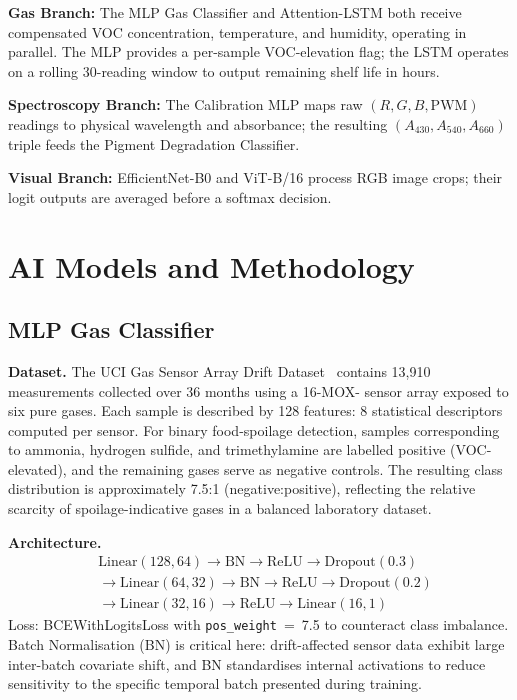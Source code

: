 \documentclass[conference]{IEEEtran}
\begin{document}
\noindent
\textbf{Gas Branch:} The MLP Gas Classifier and Attention-LSTM both
receive compensated VOC concentration, temperature, and humidity,
operating in parallel. The MLP provides a per-sample VOC-elevation flag;
the LSTM operates on a rolling 30-reading window to output remaining
shelf life in hours.

\textbf{Spectroscopy Branch:} The Calibration MLP maps raw
$(R, G, B, \text{PWM})$ readings to physical wavelength and
absorbance; the resulting $(A_{430}, A_{540}, A_{660})$ triple feeds
the Pigment Degradation Classifier.

\textbf{Visual Branch:} EfficientNet-B0 and ViT-B/16 process RGB image
crops; their logit outputs are averaged before a softmax decision.

\section{AI Models and Methodology}
\label{sec:models}

\subsection{MLP Gas Classifier}

\textbf{Dataset.} The UCI Gas Sensor Array Drift Dataset~\cite{Vergara2012}
contains 13,910 measurements collected over 36 months using a 16-MOX-
sensor array exposed to six pure gases. Each sample is described by
128 features: 8 statistical descriptors computed per sensor. For binary
food-spoilage detection, samples corresponding to ammonia, hydrogen
sulfide, and trimethylamine are labelled positive (VOC-elevated), and
the remaining gases serve as negative controls. The resulting class
distribution is approximately 7.5:1 (negative:positive), reflecting the
relative scarcity of spoilage-indicative gases in a balanced laboratory
dataset.

\textbf{Architecture.}
\begin{align*}
  &\text{Linear}(128,64) \to \text{BN} \to \text{ReLU}
   \to \text{Dropout}(0.3) \\
  &\to \text{Linear}(64,32) \to \text{BN} \to \text{ReLU}
   \to \text{Dropout}(0.2) \\
  &\to \text{Linear}(32,16) \to \text{ReLU}
   \to \text{Linear}(16,1)
\end{align*}
Loss: BCEWithLogitsLoss with \texttt{pos\_weight}~=~7.5 to counteract
class imbalance. Batch Normalisation (BN) is critical here: drift-affected
sensor data exhibit large inter-batch covariate shift, and BN standardises
internal activations to reduce sensitivity to the specific temporal
batch presented during training.
\end{document}
